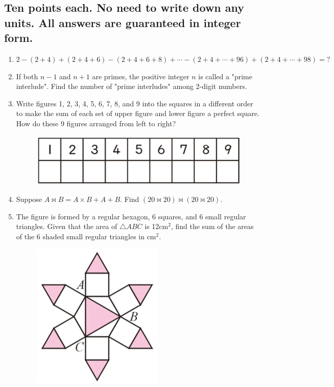 \documentclass[12pt]{scrartcl}
\begin{document}
\subsection*{Ten points each. \textbf{No need to write down any units.} All answers are guaranteed in integer form.}
\hrulefill
\begin{enumerate}[resume]
\item $2-(2+4)+(2+4+6)-(2+4+6+8)+\cdots-(2+4+\cdots+96)+(2+4+\cdots+98)=?$

\hrulefill \item If both $n-1$ and $n+1$ are primes, the positive integer $n$ is called a "prime interlude". Find the number of "prime interludes" among 2-digit numbers.

\hrulefill \item Write figures 1, 2, 3, 4, 5, 6, 7, 8, and 9 into the squares in a different order to make the sum of each set of upper figure and lower figure a perfect square. How do these 9 figures arranged from left to right?
    \begin{figure}[h]
        \centering
        \includegraphics[scale=0.6]{StarGen/0Figure/wmi-2020-5b-3.png}
    \end{figure}

\hrulefill \item Suppose $A \bowtie B = A \times B + A + B$. Find $(20 \bowtie 20) \bowtie (20 \bowtie 20)$.

\hrulefill \item The figure is formed by a regular hexagon, 6 squares, and 6 small regular triangles. Given that the area of $\triangle ABC$ is 12cm$^2$, find the sum of the areas of the 6 shaded small regular triangles in cm$^2$.
    \begin{figure}[h]
        \centering
        \includegraphics[scale=1]{StarGen/0Figure/wmi-2020-5b-5.png}
    \end{figure}


\end{enumerate}
\end{document}
